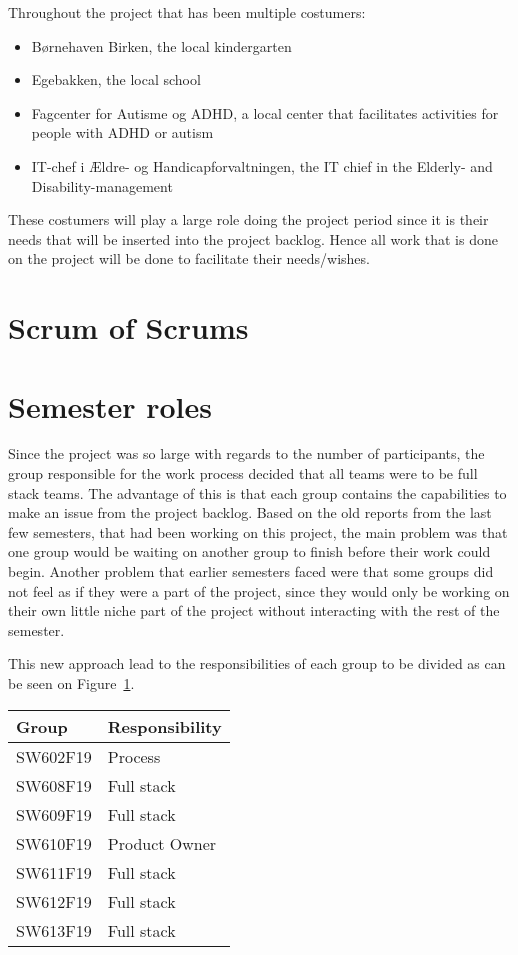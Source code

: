 Throughout the project that has been multiple costumers:

\begin{itemize}
	\item Børnehaven Birken, the local kindergarten
	\item Egebakken, the local school
	\item Fagcenter for Autisme og ADHD, a local center that facilitates activities for people with ADHD or autism
	\item IT-chef i Ældre- og Handicapforvaltningen, the IT chief in the Elderly- and Disability-management
\end{itemize}

These costumers will play a large role doing the project period since it is their needs that will be inserted into the project backlog. 
Hence all work that is done on the project will be done to facilitate their needs/wishes.

\section{Scrum of Scrums}

\section{Semester roles}
Since the project was so large with regards to the number of participants, the group responsible for the work process decided that all teams were to be full stack teams. 
The advantage of this is that each group contains the capabilities to make an issue from the project backlog. 
Based on the old reports from the last few semesters, that had been working on this project, the main problem was that one group would be waiting on another group to finish before their work could begin. 
Another problem that earlier semesters faced were that some groups did not feel as if they were a part of the project, since they would only be working on their own little niche part of the project without interacting with the rest of the semester.

This new approach lead to the responsibilities of each group to be divided as can be seen on Figure~\ref{TBL:GroupResponsibility}.

\begin{table}[H]
\centering
\begin{tabular}{|l|l|}
\hline
\textbf{Group} & \textbf{Responsibility} \\ \hline
SW602F19 & Process\\ \hline
SW608F19 & Full stack\\ \hline
SW609F19 & Full stack\\ \hline
SW610F19 & Product Owner  \\ \hline
SW611F19 & Full stack \\ \hline
SW612F19 & Full stack \\ \hline
SW613F19 & Full stack \\ \hline
\end{tabular}
\label{TBL:GroupResponsibility}
\end{table}

